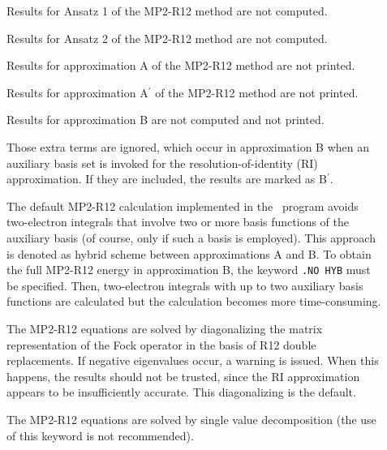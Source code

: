 \begin{description}

\item[]

Results for Ansatz 1 of the MP2-R12 method are not computed.

\item[]

Results for Ansatz 2 of the MP2-R12 method are not computed.

\item[]

Results for approximation A of the MP2-R12 method are not printed.

\item[]

Results for approximation A$^\prime$ of the MP2-R12 method are not printed.

\item[]

Results for approximation B are not computed and not printed.

\item[]

Those extra terms are ignored, which occur in approximation B when an auxiliary basis set
is invoked for the resolution-of-identity (RI) approximation. If they are included, 
the results are marked as B$^\prime$.

\item[]

The default MP2-R12 calculation implemented in the \dalton\ program
avoids two-electron integrals that involve
two or more basis functions of the auxiliary basis (of course, only
if such a basis is employed). This approach is denoted
as hybrid scheme between approximations A and B. To obtain the
full MP2-R12 energy in approximation B, the keyword \verb|.NO HYB| must
be specified. Then, two-electron integrals with up to two
auxiliary basis functions are calculated but the calculation becomes 
more time-consuming.

\item[]
The MP2-R12 equations are solved by diagonalizing the matrix representation 
of the Fock operator in the basis of R12 double replacements. If 
negative eigenvalues occur,
a warning is issued. When this happens, the results should not be trusted,
since the RI approximation appears to be insufficiently accurate.
This diagonalizing is the default.

\item[]
The MP2-R12 equations are solved by single value decomposition
(the use of this keyword is not recommended).


\end{description}
